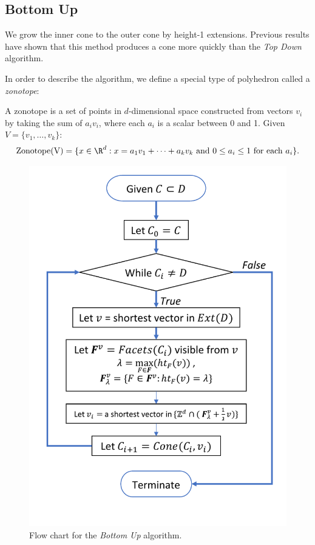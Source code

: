 \documentclass{TC}
\begin{document}
\subsection{Bottom Up}
We grow the inner cone to the outer cone by height-1 extensions. Previous results have shown that this method produces a cone more quickly than the \emph{Top Down} algorithm.

In order to describe the algorithm, we define a special type of polyhedron called a \emph{zonotope}:
\begin{definition}[Zonotope]
A zonotope is a set of points in $d$-dimensional space constructed from vectors $v_i$ by taking the sum of $a_iv_i$, where each  $a_i$ is a scalar between 0 and 1. Given $V = \{ v_1,\ldots, v_k\}$:
$$\mathrm{Zonotope(V)} = \{ x \in \R^d: x = a_1v_1 + \cdots + a_k v_k \text{ and } 0 \leq a_i \leq 1 \text{ for each } a_i \}.$$
\end{definition}
\begin{figure}[h]
\centering
\includegraphics[width=.49\textwidth]{BottomUpFC.pdf}
\caption{Flow chart for the \emph{Bottom Up} algorithm.}
\end{figure}
\end{document}
